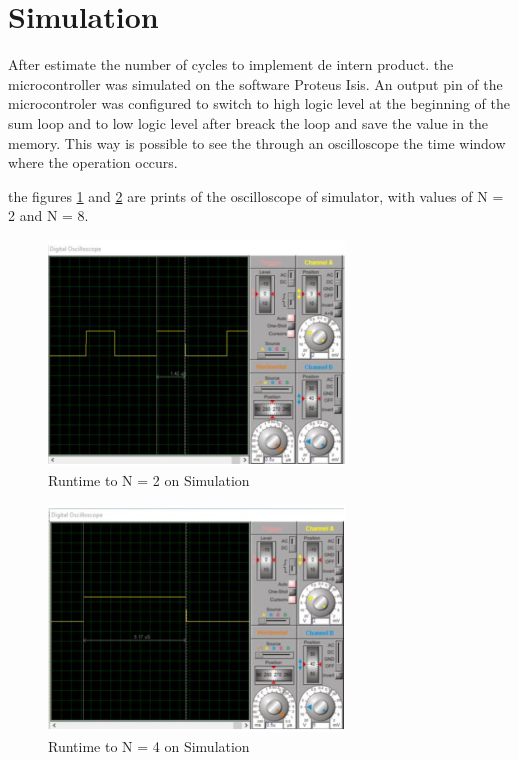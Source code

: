 \documentclass{article}
\begin{document}
\section{Simulation}
After estimate the number of cycles to implement de intern product. the microcontroller was simulated on the software Proteus Isis. An output pin of the microcontroler was configured to switch to high logic level at the beginning of the sum loop and to low logic level after breack the loop and save the value in the memory. This way is possible to see the through an oscilloscope the time window where the operation occurs. 

the figures \ref{fig:S_N_2} and \ref{fig:S_N_4} are prints of the oscilloscope of simulator, with values of N = 2 and N = 8.

\begin{figure}[!ht]
\centering
\includegraphics[width=0.7\textwidth]
{./figuras/S_N_2.PNG}
\caption{Runtime to N = 2 on Simulation}
\label{fig:S_N_2}
\end{figure}

\begin{figure}[!ht]
\centering
\includegraphics[width=0.7\textwidth]
{./figuras/S_N_4.PNG}
\caption{Runtime to N = 4 on Simulation}
\label{fig:S_N_4}
\end{figure}
\end{document}
